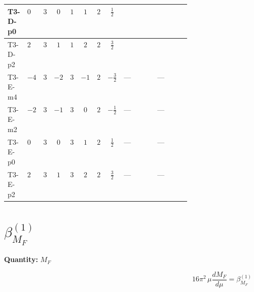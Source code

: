 \documentclass[8pt]{article}
\begin{document}
\begin{landscape}
\begin{longtable}{@{}llcccccc >{\raggedright\arraybackslash}p{0.21\linewidth} >{\raggedright\arraybackslash}p{0.21\linewidth}@{}}
\midrule
T3-D-p0 & $0$ & $3$ & $0$ & $1$ & $1$ & $2$ & $\frac{1}{2}$ & \scriptsize\adjustbox{max width=\linewidth}{$\begin{gathered} +\frac{1}{2} \left({Y_e}\,\left({Y_e}\right)^{\dagger}\,{y_2}\right)_{ij}\end{gathered}$} & \scriptsize\adjustbox{max width=\linewidth}{$\begin{gathered} +\left({y_2}\,\left({y_2}\right)^{\dagger}\,{y_2}\right)_{ij}\end{gathered}$} \\
\midrule
T3-D-p2 & $2$ & $3$ & $1$ & $1$ & $2$ & $2$ & $\frac{3}{2}$ & \scriptsize\adjustbox{max width=\linewidth}{$\begin{gathered} +\frac{1}{2} \left({Y_e}\,\left({Y_e}\right)^{\dagger}\,{y_2}\right)_{ij}\end{gathered}$} & \scriptsize\adjustbox{max width=\linewidth}{$\begin{gathered} +\left({y_2}\,\left({y_2}\right)^{\dagger}\,{y_2}\right)_{ij}\end{gathered}$} \\
\midrule
T3-E-m4 & $-4$ & $3$ & $-2$ & $3$ & $-1$ & $2$ & $-\frac{3}{2}$ & --- & --- \\
\midrule
T3-E-m2 & $-2$ & $3$ & $-1$ & $3$ & $0$ & $2$ & $-\frac{1}{2}$ & --- & --- \\
\midrule
T3-E-p0 & $0$ & $3$ & $0$ & $3$ & $1$ & $2$ & $\frac{1}{2}$ & --- & --- \\
\midrule
T3-E-p2 & $2$ & $3$ & $1$ & $3$ & $2$ & $2$ & $\frac{3}{2}$ & --- & --- \\
\midrule
\bottomrule
\end{longtable}
\clearpage
\section*{$\beta_{M_F}^{(1)}$}
\noindent\textbf{Quantity: }$M_F$\par\smallskip
\[16\pi^2\,\mu\frac{d M_F}{d\mu}=\beta_{M_F}^{(1)}\]

\end{landscape}
\end{document}
